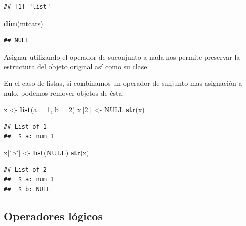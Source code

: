 \documentclass[]{article}
\newenvironment{Shaded}{\begin{snugshade}}{\end{snugshade}}
\newcommand{\KeywordTok}[1]{\textcolor[rgb]{0.13,0.29,0.53}{\textbf{{#1}}}}
\newcommand{\DataTypeTok}[1]{\textcolor[rgb]{0.13,0.29,0.53}{{#1}}}
\newcommand{\DecValTok}[1]{\textcolor[rgb]{0.00,0.00,0.81}{{#1}}}
\newcommand{\StringTok}[1]{\textcolor[rgb]{0.31,0.60,0.02}{{#1}}}
\newcommand{\OtherTok}[1]{\textcolor[rgb]{0.56,0.35,0.01}{{#1}}}
\newcommand{\NormalTok}[1]{{#1}}
\begin{document}
\begin{verbatim}
## [1] "list"
\end{verbatim}

\begin{Shaded}
\begin{Highlighting}[]
\KeywordTok{dim}\NormalTok{(mtcars)}
\end{Highlighting}
\end{Shaded}

\begin{verbatim}
## NULL
\end{verbatim}

Asignar utilizando el operador de suconjunto a nada nos permite
preservar la estructura del objeto original así como su clase.

En el caso de listas, si combinamos un operador de sunjunto mas
asignación a nulo, podemos remover objetos de ésta.

\begin{Shaded}
\begin{Highlighting}[]
\NormalTok{x <-}\StringTok{ }\KeywordTok{list}\NormalTok{(}\DataTypeTok{a =} \DecValTok{1}\NormalTok{, }\DataTypeTok{b =} \DecValTok{2}\NormalTok{)}
\NormalTok{x[[}\DecValTok{2}\NormalTok{]] <-}\StringTok{ }\OtherTok{NULL}
\KeywordTok{str}\NormalTok{(x)}
\end{Highlighting}
\end{Shaded}

\begin{verbatim}
## List of 1
##  $ a: num 1
\end{verbatim}

\begin{Shaded}
\begin{Highlighting}[]
\NormalTok{x[}\StringTok{"b"}\NormalTok{] <-}\StringTok{ }\KeywordTok{list}\NormalTok{(}\OtherTok{NULL}\NormalTok{)}
\KeywordTok{str}\NormalTok{(x)}
\end{Highlighting}
\end{Shaded}

\begin{verbatim}
## List of 2
##  $ a: num 1
##  $ b: NULL
\end{verbatim}

\subsection{Operadores lógicos}\label{operadores-logicos}
\end{document}
